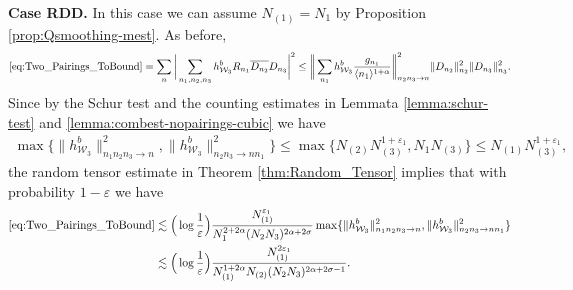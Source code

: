\documentclass[11pt, xcolor = dvipsnames,reqno
]{amsart}
\theoremstyle{definition}
\theoremstyle{remark}
\begin{document}
\noindent
\textbf{Case RDD. }  In this case we can assume $N_{(1)} = N_1$ by Proposition \ref{prop:Qsmoothing-mest}. As before, 
    \begin{align}\label{eq:RDD_With_RT}
        \eqref{eq:Two_Pairings_ToBound}
        = \sum_n \bigg| \sum_{n_1,n_2,n_3} h^b_{\mathcal{W}_3} R_{n_1} \overline{D_{n_2}} D_{n_3} \bigg|^2
        \leq  \bigg\| \sum_{n_1}  h^b_{\mathcal{W}_3} \frac{g_{n_1}}{\langle n_1 \rangle^{1 + \alpha}} \bigg\|_{n_2n_3 \rightarrow n}^2 \| D_{n_2} \|_{n_2}^2 \| D_{n_3} \|_{n_3}^2. 
    \end{align}
    Since by the Schur test and the counting estimates in Lemmata \ref{lemma:schur-test} and \ref{lemma:combest-nopairings-cubic} we have 
    \begin{align}
        \max \{ \lVert h^b_{\mathcal{W}_3} \rVert_{n_1n_2n_3 \to n}^2, 
        \lVert h^b_{\mathcal{W}_3} \rVert_{n_2n_3 \to nn_1}^2 \}
        \leq 
        \max\{ N_{(2)}N_{(3)}^{1+\varepsilon_1}, N_1 N_{(3)} \}
        \leq N_{(1)} N_{(3)}^{1+\varepsilon_1}, 
    \end{align}
    the random tensor estimate in Theorem \ref{thm:Random_Tensor} implies that with probability $1 - \varepsilon$ we have
    \begin{align*}
        \eqref{eq:Two_Pairings_ToBound}
        & \lesssim 
        \Big(\log \frac{1}{\varepsilon} \Big) \frac{N_{(1)}^{\varepsilon_1}}{N_1^{2 + 2\alpha} (N_2 N_3)^{2\alpha + 2\sigma}} \max \{ \lVert h^b_{\mathcal{W}_3} \rVert_{n_1n_2n_3 \to n}^2, 
        \lVert h^b_{\mathcal{W}_3} \rVert_{n_2n_3 \to nn_1}^2 \} \\
        & \lesssim \Big(\log \frac{1}{\varepsilon} \Big) \frac{N_{(1)}^{2\varepsilon_1}}{N_{(1)}^{1 + 2\alpha} N_{(2)} (N_2 N_3)^{2\alpha + 2\sigma - 1}}.
    \end{align*}
\end{document}
